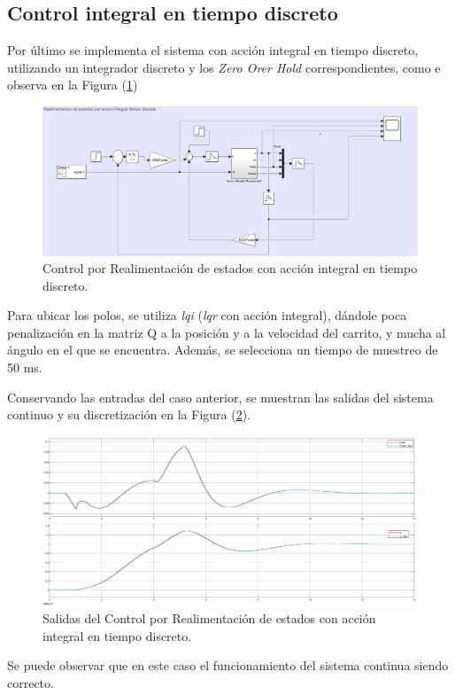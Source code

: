 \subsection{Control integral en tiempo discreto}
Por último se implementa el sistema con acción integral en tiempo discreto, utilizando un integrador discreto y los \textit{Zero Orer Hold} correspondientes, como e observa en la Figura (\ref{fig:discreteIntegralFeed})
\begin{figure}[H]
	\centering
	\includegraphics[width=0.8\linewidth]{ImagenesRealimentacióndeEstados/discreteIntegralFeed}
	\caption{Control por Realimentación de estados con acción integral en tiempo discreto.}	
	\label{fig:discreteIntegralFeed}
\end{figure}

Para ubicar los polos, se utiliza \textit{lqi} (\textit{lqr} con acción integral), dándole poca penalización en la matriz Q a la posición y a la velocidad del carrito, y mucha al ángulo en el que se encuentra. Además, se selecciona un tiempo de muestreo de 50 ms.

Conservando las entradas del caso anterior, se muestran las salidas del sistema continuo y su discretización en la Figura (\ref{fig:discreteIntegralFeedOut}).
\begin{figure}[H]
	\centering
	\includegraphics[width=0.8\linewidth]{ImagenesRealimentacióndeEstados/discreteIntegralFeedOut}
	\caption{Salidas del Control por Realimentación de estados con acción integral en tiempo discreto.}	
	\label{fig:discreteIntegralFeedOut}
\end{figure}

Se puede observar que en este caso el funcionamiento del sistema continua siendo correcto.
%